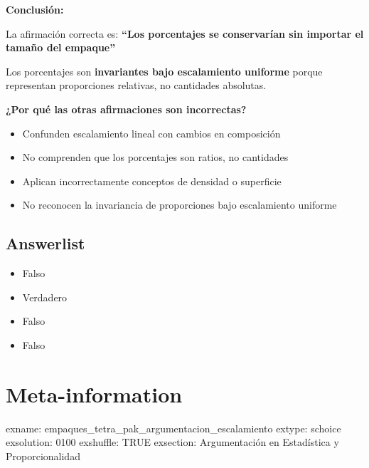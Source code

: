 \documentclass[
]{article}
\providecommand{\tightlist}{%
  \setlength{\itemsep}{0pt}\setlength{\parskip}{0pt}}
\begin{document}
\textbf{Conclusión:}

La afirmación correcta es: \textbf{``Los porcentajes se conservarían sin
importar el tamaño del empaque''}

Los porcentajes son \textbf{invariantes bajo escalamiento uniforme}
porque representan proporciones relativas, no cantidades absolutas.

\textbf{¿Por qué las otras afirmaciones son incorrectas?}

\begin{itemize}
\tightlist
\item
  Confunden escalamiento lineal con cambios en composición
\item
  No comprenden que los porcentajes son ratios, no cantidades
\item
  Aplican incorrectamente conceptos de densidad o superficie
\item
  No reconocen la invariancia de proporciones bajo escalamiento uniforme
\end{itemize}

\subsection{Answerlist}\label{answerlist-1}

\begin{itemize}
\tightlist
\item
  Falso
\item
  Verdadero
\item
  Falso
\item
  Falso
\end{itemize}

\section{Meta-information}\label{meta-information}

exname: empaques\_tetra\_pak\_argumentacion\_escalamiento extype:
schoice exsolution: 0100 exshuffle: TRUE exsection: Argumentación en
Estadística y Proporcionalidad
\end{document}
